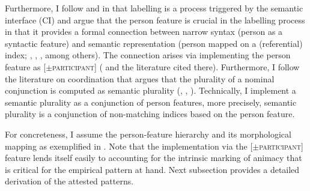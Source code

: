 \documentclass[output=paper,
modfonts
newtxmath,
hidelinks
]{langscibook}
\begin{document}
Furthermore, I follow \citet{Narita2011} and \citet{Chomsky2013} in that labelling is a process triggered by the semantic interface (CI) and argue that the person feature is crucial in the labelling process in that it provides a formal connection between narrow syntax (person as a syntactic feature) and semantic representation (person mapped on a (referential) index; \citealt{Longobardi2008}, \citealt{Sudo2012}, \citealt{Landau2010}, among others). The connection arises via implementing the person feature as [$\pm$\textsc{participant}] (\cite{Nevins2007} and the literature cited there). Furthermore, I follow the literature on coordination that argues that the plurality of a nominal conjunction is computed as semantic plurality (\citealt{Munn1993}, \citealt{Bošković2009}, \citealt{Bhatt2013}). Technically, I implement a semantic plurality as a conjunction of person features, more precisely, semantic plurality is a conjunction of non-matching indices based on the person feature. 

For concreteness, I assume the person-feature hierarchy and its morphological mapping as exemplified in . 
Note that the implementation via the [$\pm$\textsc{participant}] feature lends itself easily to accounting for the intrinsic marking of animacy that is critical for the empirical pattern at hand. Next subsection provides a detailed derivation of the attested patterns.
\end{document}
